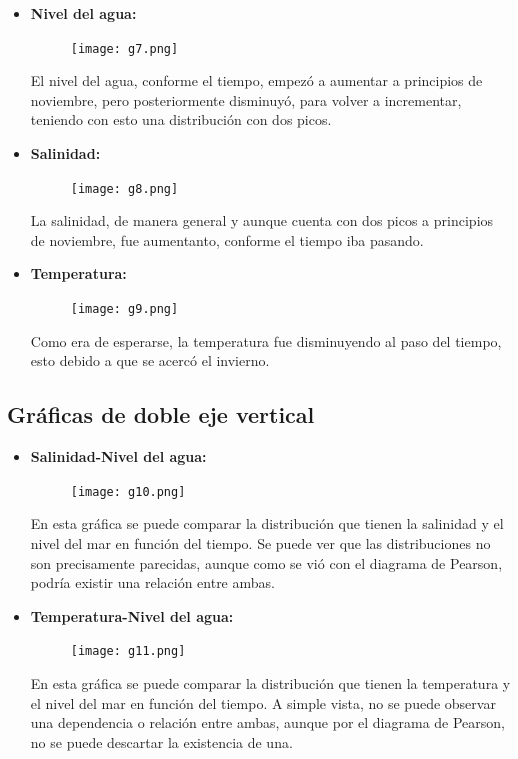 \documentclass[12pt]{article}
\begin{document}
\begin{itemize}
\item \textbf{Nivel del agua:}

\begin{figure}[h!]
  \texttt{[image: g7.png]}
  \centering
  \label{fig:g7}
\end{figure}

El nivel del agua, conforme el tiempo, empezó a aumentar a principios de noviembre, pero posteriormente disminuyó, para volver a incrementar, teniendo con esto una distribución con dos picos. 

\item\textbf{Salinidad:}
\begin{figure}[h!]
  \texttt{[image: g8.png]}
  \centering
  \label{fig:g8}
\end{figure}

La salinidad, de manera general y aunque cuenta con dos picos a principios de noviembre, fue aumentanto, conforme el tiempo iba pasando. 

\item \textbf{Temperatura:}

\begin{figure}[h!]
  \texttt{[image: g9.png]}
  \centering
  \label{fig:g9}
\end{figure}

Como era de esperarse, la temperatura fue disminuyendo al paso del tiempo, esto debido a que se acercó el invierno.

\end{itemize}

\subsection{Gráficas de doble eje vertical}

\begin{itemize}
\item \textbf{Salinidad-Nivel del agua:}
\begin{figure}[h!]
  \texttt{[image: g10.png]}
  \centering
  \label{fig:g10}
\end{figure}

En esta gráfica se puede comparar la distribución que tienen la salinidad y el nivel del mar en función del tiempo. Se puede ver que las distribuciones no son precisamente parecidas, aunque como se vió con el diagrama de Pearson, podría existir una relación entre ambas. 

\item\textbf{Temperatura-Nivel del agua:}

\begin{figure}[h!]
  \texttt{[image: g11.png]}
  \centering
  \label{fig:g11}
\end{figure}

En esta gráfica se puede comparar la distribución que tienen la temperatura y el nivel del mar en función del tiempo. A simple vista, no se puede observar una dependencia o relación entre ambas, aunque por el diagrama de Pearson, no se puede descartar la existencia de una. 

\end{itemize}
\end{document}
